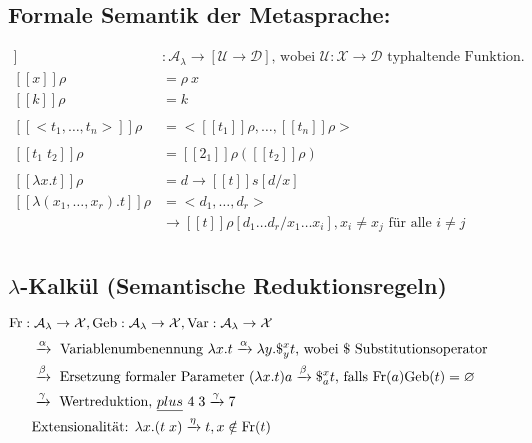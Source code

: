 \subsection{Formale Semantik der Metasprache:}
\begin{align*}
[\![ \; ]\!] &: \mathcal{A}_\lambda \rightarrow [\mathcal{U} \rightarrow \mathcal{D}] \text{, wobei } \mathcal{U}:\mathcal{X} \rightarrow \mathcal{D} \text{ typhaltende Funktion.}\\
[\![ x ]\!] \rho &= \rho \ x \\
[\![ k ]\!] \rho &= k \tag{1}\\
\\
[\![ <t_1, \dots, t_n> ]\!] \rho &= <[\![ t_1 ]\!]\rho, \dots , [\![ t_n ]\!] \rho > \tag{2}\\
\\
[\![ t_1 \; t_2 ]\!] \rho &= [\![ 2_1 ]\!] \rho ([\![ t_2 ]\!] \rho)  \tag{3}\\
\\
[\![\lambda x.t ]\!] \rho &= d \rightarrow [\![ t ]\!] s [d/x] \tag{4a}\\
[\![ \lambda (x_1,\dots, x_r).t ]\!] \rho &= <d_1, \dots , d_r> \\
&\rightarrow [\![ t ]\!] \rho [d_1 \dots d_r / x_1 \dots x_i], x_i \neq x_j \text{ für alle } i \neq j \tag{4b}\\
\end{align*}

\subsection{$\lambda$-Kalkül (Semantische Reduktionsregeln)}
$\text{\lstinline!Fr!} : \mathcal{A}_\lambda \rightarrow \mathcal{X}, \text{\lstinline!Geb!}: \mathcal{A}_\lambda \rightarrow \mathcal{X}, \text{\lstinline!Var!} : \mathcal{A}_\lambda \rightarrow \mathcal{X}$ 
\begin{align*}
&\xrightarrow{\alpha} \text{ Variablenumbenennung } \lambda x.t \xrightarrow{\alpha} \lambda y. \$^x_y t \text{, wobei } \$ \text{ Substitutionsoperator}\\
&\xrightarrow{\beta}	\text{ Ersetzung formaler Parameter } (\lambda x.t) a \xrightarrow{\beta}	\$^x_a t \text{, falls } \text{\lstinline!Fr!}(a) \text{\lstinline!Geb!}(t) = \varnothing\\
&\xrightarrow{\gamma} \text{ Wertreduktion, } \underline{plus}\ 4\; 3 \xrightarrow{\gamma} 7 \\
&\text{Extensionalität: } \lambda x.(t\;x) \xrightarrow{\eta} t, x \notin \text{\lstinline!Fr!}(t)\\ 
\end{align*}